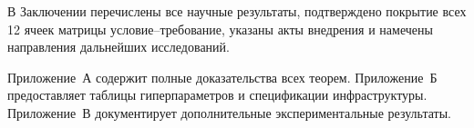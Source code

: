 В Заключении перечислены все научные результаты, подтверждено покрытие всех 12 ячеек матрицы условие--требование, указаны акты внедрения и намечены направления дальнейших исследований.

Приложение~А содержит полные доказательства всех теорем. Приложение~Б предоставляет таблицы гиперпараметров и спецификации инфраструктуры. Приложение~В документирует дополнительные экспериментальные результаты.